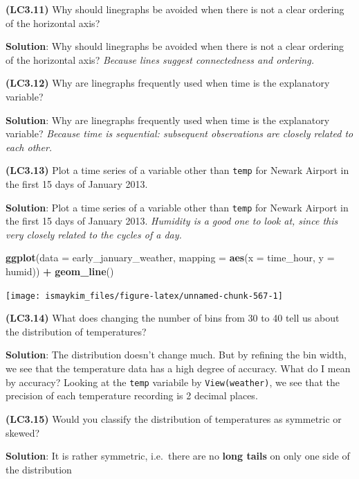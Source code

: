 \documentclass[12pt, krantz2,]{krantz}
\makeatletter
\newenvironment{Shaded}{\begin{snugshade}}{\end{snugshade}}
\newcommand{\DataTypeTok}[1]{\textcolor[rgb]{0.27,0.27,0.27}{#1}}
\newcommand{\KeywordTok}[1]{\textcolor[rgb]{0.27,0.27,0.27}{\textbf{#1}}}
\newcommand{\NormalTok}[1]{#1}
\newcommand{\OperatorTok}[1]{\textcolor[rgb]{0.43,0.43,0.43}{\textbf{#1}}}
\newcommand{\StringTok}[1]{\textcolor[rgb]{0.5,0.5,0.5}{#1}}
\newenvironment{kframe}{%
\medskip{}
\setlength{\fboxsep}{.8em}
 \def\at@end@of@kframe{}%
 \ifinner\ifhmode%
  \def\at@end@of@kframe{\end{minipage}}%
  \begin{minipage}{\columnwidth}%
 \fi\fi%
 \def\FrameCommand##1{\hskip\@totalleftmargin \hskip-\fboxsep
 \colorbox{shadecolor}{##1}\hskip-\fboxsep
     \hskip-\linewidth \hskip-\@totalleftmargin \hskip\columnwidth}%
 \MakeFramed {\advance\hsize-\width
   \@totalleftmargin\z@ \linewidth\hsize
   \@setminipage}}%
 {\par\unskip\endMakeFramed%
 \at@end@of@kframe}
\renewenvironment{Shaded}{\begin{kframe}}{\end{kframe}}
\makeatother
\begin{document}
\textbf{(LC3.11)} Why should linegraphs be avoided when there is not a clear ordering of the horizontal axis?

\textbf{Solution}: Why should linegraphs be avoided when there is not a clear ordering of the horizontal axis? \emph{Because lines suggest connectedness and ordering.}

\textbf{(LC3.12)} Why are linegraphs frequently used when time is the explanatory variable?

\textbf{Solution}: Why are linegraphs frequently used when time is the explanatory variable? \emph{Because time is sequential: subsequent observations are closely related to each other.}

\textbf{(LC3.13)} Plot a time series of a variable other than \texttt{temp} for Newark Airport in the first 15 days of January 2013.

\textbf{Solution}: Plot a time series of a variable other than \texttt{temp} for Newark Airport in the first 15 days of January 2013. \emph{Humidity is a good one to look at, since this very closely related to the cycles of a day.}

\begin{Shaded}
\begin{Highlighting}[]
\KeywordTok{ggplot}\NormalTok{(}\DataTypeTok{data =}\NormalTok{ early_january_weather, }\DataTypeTok{mapping =} \KeywordTok{aes}\NormalTok{(}\DataTypeTok{x =}\NormalTok{ time_hour, }\DataTypeTok{y =}\NormalTok{ humid)) }\OperatorTok{+}
\StringTok{  }\KeywordTok{geom_line}\NormalTok{()}
\end{Highlighting}
\end{Shaded}

\begin{center}\texttt{[image: ismaykim\_files/figure-latex/unnamed-chunk-567-1]} \end{center}

\textbf{(LC3.14)} What does changing the number of bins from 30 to 40 tell us about the distribution of temperatures?

\textbf{Solution}: The distribution doesn't change much. But by refining the bin width, we see that the temperature data has a high degree of accuracy. What do I mean by accuracy? Looking at the \texttt{temp} variabile by \texttt{View(weather)}, we see that the precision of each temperature recording is 2 decimal places.

\textbf{(LC3.15)} Would you classify the distribution of temperatures as symmetric or skewed?

\textbf{Solution}: It is rather symmetric, i.e.~there are no \textbf{long tails} on only one side of the distribution
\end{document}
